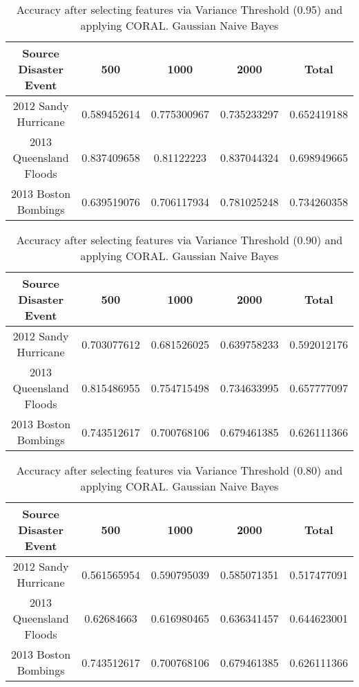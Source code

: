 \begin{table}[ht]
    \begin{center}
    \caption{Accuracy after selecting features via Variance Threshold (0.95) and applying CORAL. Gaussian Naive Bayes}
    \begin{tabular}[c]{|c|c|c|c|c|}
        \hline
        Source Disaster Event & 500 & 1000 & 2000 & Total \\
        \hline
        2012 Sandy Hurricane & 0.589452614 & 0.775300967 & 0.735233297 & 0.652419188 \\
        2013 Queensland Floods & 0.837409658 & 0.81122223 & 0.837044324 & 0.698949665 \\
        2013 Boston Bombings & 0.639519076 & 0.706117934 & 0.781025248 & 0.734260358 \\
        \hline
    \end{tabular}
    \label{tablevar95}
   \end{center}
\end{table}

\begin{table}[ht]
    \begin{center}
    \caption{Accuracy after selecting features via Variance Threshold (0.90) and applying CORAL. Gaussian Naive Bayes}
    \begin{tabular}[c]{|c|c|c|c|c|}
        \hline
        Source Disaster Event & 500 & 1000 & 2000 & Total \\
        \hline
        2012 Sandy Hurricane & 0.703077612 & 0.681526025 & 0.639758233 & 0.592012176 \\
        2013 Queensland Floods & 0.815486955 & 0.754715498 & 0.734633995 & 0.657777097 \\
        2013 Boston Bombings & 0.743512617 & 0.700768106 & 0.679461385 & 0.626111366 \\
        \hline
    \end{tabular}
    \label{tablevar9}
   \end{center}
\end{table}

\begin{table}[ht]
    \begin{center}
    \caption{Accuracy after selecting features via Variance Threshold (0.80) and applying CORAL. Gaussian Naive Bayes}
    \begin{tabular}[c]{|c|c|c|c|c|}
        \hline
        Source Disaster Event & 500 & 1000 & 2000 & Total \\
        \hline
        2012 Sandy Hurricane & 0.561565954 & 0.590795039 & 0.585071351 & 0.517477091 \\
        2013 Queensland Floods & 0.62684663 & 0.616980465 & 0.636341457 & 0.644623001 \\
        2013 Boston Bombings & 0.743512617 & 0.700768106 & 0.679461385 & 0.626111366 \\
        \hline
    \end{tabular}
    \label{tablevar8}
   \end{center}
\end{table}


